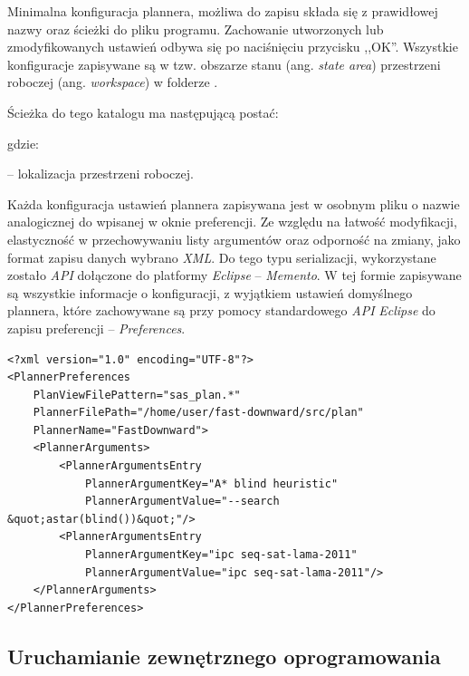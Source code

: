 Minimalna konfiguracja plannera, możliwa do zapisu składa się z prawidłowej nazwy oraz ścieżki do pliku programu. Zachowanie utworzonych lub zmodyfikowanych ustawień odbywa się po naciśnięciu przycisku ,,OK''.
Wszystkie konfiguracje zapisywane są w tzw. obszarze stanu (ang. \textit{state area}) przestrzeni roboczej (ang. \textit{workspace}) w folderze . 

Ścieżka do tego katalogu ma następującą postać:

\noindent
\centerline{}

\noindent
gdzie:

\noindent
\textbf{} -- lokalizacja przestrzeni roboczej.

Każda konfiguracja ustawień plannera zapisywana jest w osobnym pliku o nazwie analogicznej do wpisanej w oknie preferencji. Ze względu na łatwość modyfikacji, elastyczność w przechowywaniu listy argumentów oraz odporność na zmiany, jako format zapisu danych wybrano \textit{XML}. Do tego typu serializacji, wykorzystane zostało \textit{API} dołączone do platformy \textit{Eclipse} -- \textit{Memento}. W tej formie zapisywane są wszystkie informacje o konfiguracji, z wyjątkiem ustawień domyślnego plannera, które zachowywane są przy pomocy standardowego \textit{API} \textit{Eclipse} do zapisu preferencji -- \textit{Preferences}.

\lstset{language=XML}          %
\begin{lstlisting}[frame=single,caption={Przykładowa konfiguracja plannera FastDownward w postaci XML}]  % Start your code-block
<?xml version="1.0" encoding="UTF-8"?>
<PlannerPreferences 
	PlanViewFilePattern="sas_plan.*" 
	PlannerFilePath="/home/user/fast-downward/src/plan" 
	PlannerName="FastDownward">
	<PlannerArguments>
		<PlannerArgumentsEntry 
			PlannerArgumentKey="A* blind heuristic" 
			PlannerArgumentValue="--search &quot;astar(blind())&quot;"/>
		<PlannerArgumentsEntry 
			PlannerArgumentKey="ipc seq-sat-lama-2011" 
			PlannerArgumentValue="ipc seq-sat-lama-2011"/>
	</PlannerArguments>
</PlannerPreferences>
\end{lstlisting}

\subsection{Uruchamianie zewnętrznego oprogramowania}
\label{subsec:uruchamianie}

